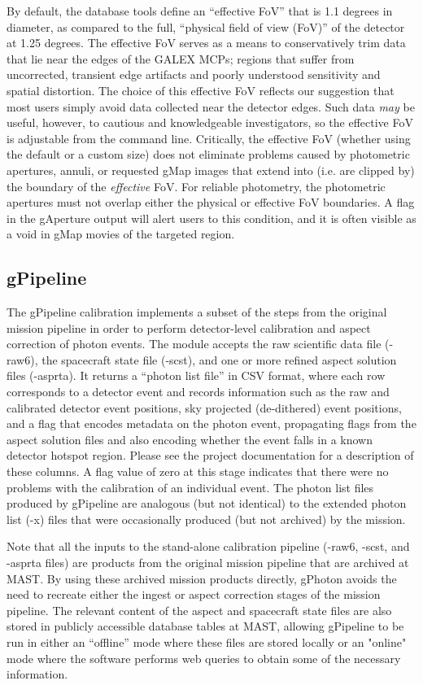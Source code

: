 \documentclass[preprint]{aastex}
\begin{document}
By default, the database tools define an ``effective FoV'' that is 1.1 degrees in diameter, as compared to the full, ``physical field of view (FoV)'' of the detector at 1.25 degrees. The effective FoV serves as a means to conservatively trim data that lie near the edges of the GALEX MCPs; regions that suffer from uncorrected, transient edge artifacts and poorly understood sensitivity and spatial distortion. The choice of this effective FoV reflects our suggestion that most users simply avoid data collected near the detector edges. Such data \emph{may} be useful, however, to cautious and knowledgeable investigators, so the effective FoV is adjustable from the command line. Critically, the effective FoV (whether using the default or a custom size) does not eliminate problems caused by photometric apertures, annuli, or requested gMap images that extend into (i.e. are clipped by) the boundary of the \emph{effective} FoV. For reliable photometry, the photometric apertures must not overlap either the physical or effective FoV boundaries. A flag in the gAperture output will alert users to this condition, and it is often visible as a void in gMap movies of the targeted region.

\subsection{gPipeline}
The gPipeline calibration implements a subset of the steps from the original mission pipeline in order to perform detector-level calibration and aspect correction of photon events. The module accepts the raw scientific data file (-raw6), the spacecraft state file (-scst), and one or more refined aspect solution files (-asprta). It returns a ``photon list file'' in CSV format, where each row corresponds to a detector event and records information such as the raw and calibrated detector event positions, sky projected (de-dithered) event positions, and a flag that encodes metadata on the photon event, propagating flags from the aspect solution files and also encoding whether the event falls in a known detector hotspot region. Please see the project documentation for a description of these columns. A flag value of zero at this stage indicates that there were no problems with the calibration of an individual event. The photon list files produced by gPipeline are analogous (but not identical) to the extended photon list (-x) files that were occasionally produced (but not archived) by the mission.

Note that all the inputs to the stand-alone calibration pipeline (-raw6, -scst, and -asprta files) are products from the original mission pipeline that are archived at MAST. By using these archived mission products directly, gPhoton avoids the need to recreate either the ingest or aspect correction stages of the mission pipeline. The relevant content of the aspect and spacecraft state files are also stored in publicly accessible database tables at MAST, allowing gPipeline to be run in either an ``offline'' mode where these files are stored locally or an "online" mode where the software performs web queries to obtain some of the necessary information.
\end{document}
